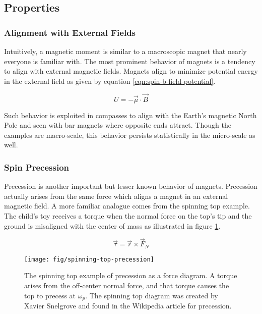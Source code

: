 \subsection{Properties}

\subsubsection{Alignment with External Fields}
Intuitively, a magnetic moment is similar to a macroscopic magnet that nearly everyone is familiar with.  The most prominent behavior of magnets is a tendency to align with external magnetic fields.  Magnets align to minimize potential energy in the external field as given by equation \ref{eqn:spin-b-field-potential}. 

\begin{equation}
\label{eqn:spin-b-field-potential}
U = -\vec{\mu} \cdot \vec{B}
\end{equation}

\noindent 
Such behavior is exploited in compasses to align with the Earth's magnetic North Pole and seen with bar magnets where opposite ends attract.  Though the examples are macro-scale, this behavior persists statistically in the micro-scale as well.

\subsubsection{Spin Precession}
Precession is another important but lesser known behavior of magnets.  Precession actually arises from the same force which aligns a magnet in an external magnetic field.  A more familiar analogue comes from the spinning top example.  The child's toy receives a torque when the normal force on the top's tip and the ground is misaligned with the center of mass as illustrated in figure \ref{fig:spinning-top-precession}.

\begin{equation}
\label{eqn:top-torque-equation}
\vec{\tau} = \vec{r} \times \vec{F}_{N}
\end{equation}

\begin{figure}
\centering
\texttt{[image: fig/spinning-top-precession]}
\caption{
    The spinning top example of precession as a force diagram.  A torque arises from the off-center normal force, and that torque causes the top to precess at $\omega_p$.  The spinning top diagram was created by Xavier Snelgrove and found in the Wikipedia article for precession. 
    \label{fig:spinning-top-precession}
}
\end{figure}

